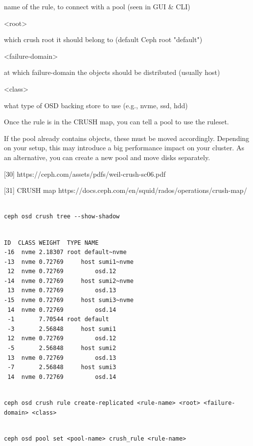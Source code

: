name of the rule, to connect with a pool (seen in GUI & CLI)

<root>

which crush root it should belong to (default Ceph root "default")

<failure-domain>

at which failure-domain the objects should be distributed (usually host)

<class>

what type of OSD backing store to use (e.g., nvme, ssd, hdd)

Once the rule is in the CRUSH map, you can tell a pool to use the ruleset.

If the pool already contains objects, these must be moved accordingly. Depending on your setup, this may introduce a big performance impact on your cluster. As an alternative, you can create a new pool and move disks separately.

[30] https://ceph.com/assets/pdfs/weil-crush-sc06.pdf

[31] CRUSH map https://docs.ceph.com/en/squid/rados/operations/crush-map/

\begin{lstlisting}

ceph osd crush tree --show-shadow

\end{lstlisting}

\begin{lstlisting}

ID  CLASS WEIGHT  TYPE NAME
-16  nvme 2.18307 root default~nvme
-13  nvme 0.72769     host sumi1~nvme
 12  nvme 0.72769         osd.12
-14  nvme 0.72769     host sumi2~nvme
 13  nvme 0.72769         osd.13
-15  nvme 0.72769     host sumi3~nvme
 14  nvme 0.72769         osd.14
 -1       7.70544 root default
 -3       2.56848     host sumi1
 12  nvme 0.72769         osd.12
 -5       2.56848     host sumi2
 13  nvme 0.72769         osd.13
 -7       2.56848     host sumi3
 14  nvme 0.72769         osd.14

\end{lstlisting}

\begin{lstlisting}

ceph osd crush rule create-replicated <rule-name> <root> <failure-domain> <class>

\end{lstlisting}

\begin{lstlisting}

ceph osd pool set <pool-name> crush_rule <rule-name>

\end{lstlisting}

